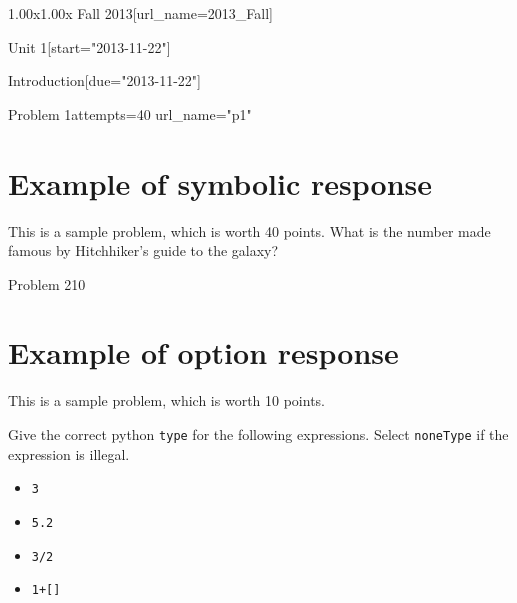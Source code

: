 \documentclass[12pt]{article}
\begin{document}
\begin{edXcourse}{1.00x}{1.00x Fall 2013}[url_name=2013_Fall]

\begin{edXchapter}{Unit 1}[start="2013-11-22"]

\begin{edXsection}{Introduction}[due="2013-11-22"]

\begin{edXproblem}{Problem 1}{attempts=40 url_name="p1"}

\section{Example of symbolic response}  
 
This is a sample problem, which is worth 40 points.  What is the number made famous by
Hitchhiker's guide to the galaxy?


\end{edXproblem}


\begin{edXproblem}{Problem 2}{10}

\section{Example of option response}  

This is a sample problem, which is worth 10 points.

Give the correct python {\tt type} for the following expressions.  Select {\tt noneType} if the expression is illegal.

\begin{itemize}
\item {\tt 3}   
\item {\tt 5.2} 
\item {\tt 3/2} 
\item {\tt 1+[]} 
\end{itemize}

\end{edXproblem}



\end{edXsection}
\end{edXchapter}
\end{edXcourse}
\end{document}
